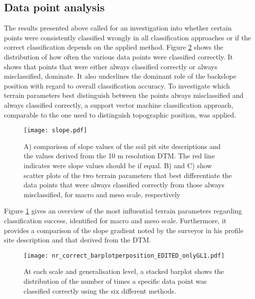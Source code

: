 \documentclass[preprint,12pt,authoryear]{elsarticle}
\begin{document}
\subsection{Data point analysis} 
The results presented above called for an investigation into whether certain points were consistently classified wrongly in all classification approaches or if the correct classification depends on the applied method. Figure \ref{fig:hist_correct_per_tp} shows the distribution of how often the various data points were classified correctly. It shows that points that were either always classified correctly or always misclassified, dominate. It also underlines the dominant role of the backslope position with regard to overall classification accuracy. To investigate which terrain parameters best distinguish between the points always misclassified and always classified correctly, a support vector machine classification approach, comparable to the one used to distinguish topographic position, was applied.
\begin{figure}
\texttt{[image: slope.pdf]}
\caption{A) comparison of slope values of the soil pit site descriptions and the  values derived from the 10 m resolution DTM. The red line indicates were slope values should be if equal. B) and C) show scatter plots of the two terrain parameters that best differentiate the data points that were always classified correctly from those always misclassified, for macro and meso scale, respectively}
\label{fig:slope}
\end{figure}
 Figure \ref{fig:slope} gives an overview of the most influential terrain parameters regarding classification success, identified for macro and meso scale. Furthermore, it provides a comparison of the slope gradient noted by the surveyor in his profile site description and that derived from the DTM.

\begin{figure}
\texttt{[image: nr\_correct\_barplotperposition\_EDITED\_onlyGL1.pdf]}
\caption{At each scale and generalisation level, a stacked barplot shows the distribution of the number of times a specific data point was classified correctly using the six different methods.}
\label{fig:hist_correct_per_tp}
\end{figure}
\end{document}

